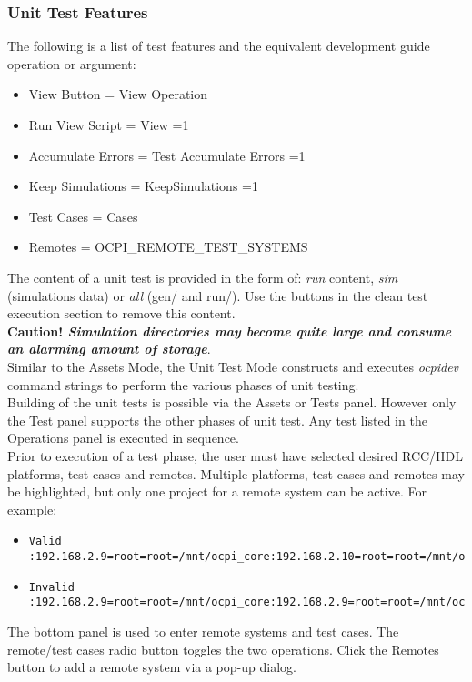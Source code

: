 \subsubsection{Unit Test Features}
The following is a list of test features and the equivalent development guide operation or argument:
\begin{itemize}
\item	View Button = View Operation
\item	Run View Script = View =1
\item	Accumulate Errors = Test Accumulate Errors =1
\item	Keep Simulations = KeepSimulations =1
\item	Test Cases = Cases
\item	Remotes = OCPI\_REMOTE\_TEST\_SYSTEMS
\end{itemize}

The content of a unit test is provided in the form of: \emph{run} content, \emph{sim} (simulations data) or \emph{all} (gen/ and run/). Use the buttons in the clean test execution section to remove this content. \\

\textbf{Caution! \emph{Simulation directories may become quite large and consume an alarming amount of storage}}.\\

Similar to the Assets Mode, the Unit Test Mode constructs and executes \emph{ocpidev} command strings to perform the various phases of unit testing.\\

Building of the unit tests is possible via the Assets or Tests panel. However only the Test panel supports the other phases of unit test. Any test listed in the Operations panel is executed in sequence. \\

Prior to execution of a test phase, the user must have selected desired RCC/HDL platforms, test cases and remotes. Multiple platforms, test cases and remotes may be highlighted, but only one project for a remote system can be active.
For example:
\begin{itemize}
\item\begin{verbatim}Valid :192.168.2.9=root=root=/mnt/ocpi_core:192.168.2.10=root=root=/mnt/ocpi_assets\end{verbatim}
\item	\begin{verbatim}Invalid :192.168.2.9=root=root=/mnt/ocpi_core:192.168.2.9=root=root=/mnt/ocpi_assets\end{verbatim}
\end{itemize}
The bottom panel is used to enter remote systems and test cases. The remote/test cases radio button toggles the two operations. Click the Remotes button to add a remote system via a pop-up dialog. \\

